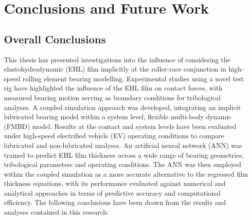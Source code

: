 \chapter{Conclusions and Future Work}
\label{Conclusions}

\section{Overall Conclusions}

This thesis has presented investigations into the influence of considering the elastohydrodynamic (EHL) film implicitly at the roller-race conjunction in high-speed rolling element bearing modelling. Experimental studies using a novel test rig have highlighted the influence of the EHL film on contact forces, with measured bearing motion serving as boundary conditions for tribological analyses. A coupled simulation approach was developed, integrating an implicit lubricated bearing model within a system level, flexible multi-body dynamic (FMBD) model. Results at the contact and system levels have been evaluated under high-speed electrified vehicle (EV) operating conditions to compare lubricated and non-lubricated analyses. An artificial neural network (ANN) was trained to predict EHL film thickness across a wide range of bearing geometries, tribological parameters and operating conditions. The ANN was then employed within the coupled simulation as a more accurate alternative to the regressed film thickness equations, with its performance evaluated against numerical and analytical approaches in terms of predictive accuracy and computational efficiency. The following conclusions have been drawn from the results and analyses contained in this research:

